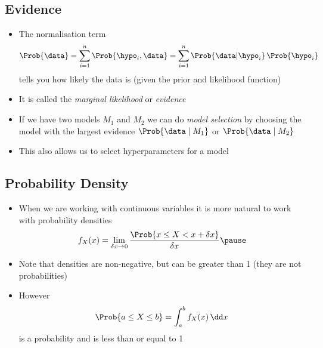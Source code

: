 
\begin{slide}
\section[-2]{Evidence}
 
\begin{PauseHighLight}
  \begin{itemize}
  \item The normalisation term 
      \begin{align*}
        \Prob{\data} = \sum_{i=1}^n\Prob{\hypo_i,\data}
        = \sum_{i=1}^n \Prob{\data|\hypo_i} \,\Prob{\hypo_i}
      \end{align*}
      tells you how likely the data is (given the prior and likelihood
      function)\pause
    \item It is called the \emph{marginal likelihood}\pause{} or
      \emph{evidence}\pauseb
    \item If we have two models $M_1$ and $M_2$ we can do \emph{model
      selection} by choosing the model with the largest evidence
      $\Prob{\data\mid M_1}$ or $\Prob{\data\mid M_2}$\pause
    \item This also allows us to select hyperparameters for a model\pause
  \end{itemize}
\end{PauseHighLight}

\end{slide}



\begin{slide}
\section{Probability Density}

\begin{PauseHighLight}
  \begin{itemize}
  \item When we are working with continuous variables it is more natural
    to work with probability densities
    \begin{align*}
      f_X(x) = \lim_{\delta x \rightarrow 0} \frac{\Prob{x\leq X < x +
      \delta x}}{\delta x}\pause
    \end{align*}
  \item Note that densities are non-negative, but can be greater than
    1 (they are not probabilities)\pause
  \item However
    \begin{align*}
      \Prob{a\leq X \leq b} = \int_a^b f_X(x)\, \dd x
    \end{align*}
  is a probability and is less than or equal to 1\pause
  \end{itemize}
\end{PauseHighLight}

\end{slide}

